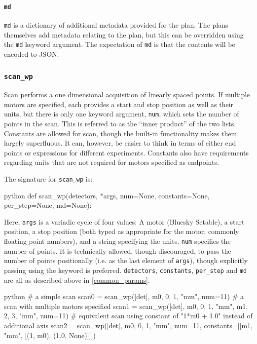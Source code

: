 \paragraph{\texttt{md}}
\texttt{md} is a dictionary of additional metadata provided for the plan.
The plans themselves add metadata relating to the plan, but this can be overridden using the \texttt{md} keyword argument.
The expectation of \texttt{md} is that the contents will be encoded to JSON.

\subsubsection{\texttt{scan\_wp}}

Scan performs a one dimensional acquisition of linearly spaced points.
If multiple motors are specified, each provides a start and stop position as well as their units, but there is only one keyword argument, \texttt{num}, which sets the number of points in the scan.
This is referred to as the ``inner product'' of the two lists.
Constants are allowed for scan, though the built-in functionality makes them largely superfluous.
It can, however, be easier to think in terms of either end points or expressions for different experiments.
Constants also have requirements regarding units that are not required for motors specified as endpoints.

The signature for \texttt{scan\_wp} is:

\begin{codefragment}{python}
def scan_wp(detectors, *args, num=None, constants=None, per_step=None, md=None):
\end{codefragment}

Here, \texttt{args} is a variadic cycle of four values: A motor (Bluesky Setable), a start position, a stop position (both typed as appropriate for the motor, commonly floating point numbers), and a string specifying the units.
\texttt{num} specifies the number of points.
It is technically allowed, though discouraged, to pass the number of points positionally (i.e. as the last element of \texttt{args}), though explicitly passing using the keyword is preferred.
\texttt{detectors}, \texttt{constants}, \texttt{per\_step} and \texttt{md} are all as described above in \ref{common_params}.

\begin{codefragment}{python}
# a simple scan
scan0 = scan_wp([det], m0, 0, 1, "mm", num=11)
# a scan with multiple motors specified
scan1 = scan_wp([det], m0, 0, 1, "mm", m1, 2, 3, "mm", num=11)
# equivalent scan using constant of "1*m0 + 1.0" instead of additional axis
scan2 = scan_wp([det], m0, 0, 1, "mm", num=11,
                constants=[[m1, "mm", [(1, m0), (1.0, None)]]])
\end{codefragment}

